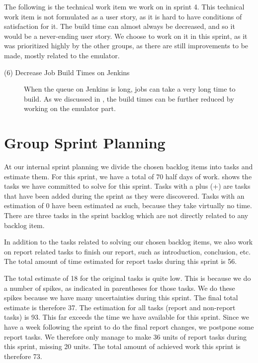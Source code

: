 The following is the technical work item we work on in sprint 4. This technical work item is not formulated as a user story, as it is hard to have conditions of satisfaction for it. The build time can almost always be decreased, and so it would be a never-ending user story. We choose to work on it in this sprint, as it was prioritized highly by the other groups, as there are still improvements to be made, mostly related to the emulator.

\begin{description}
  \item[(6) Decrease Job Build Times on Jenkins] When the queue on Jenkins is long, jobs can take a very long time to build. As we discussed in , the build times can be further reduced by working on the emulator part.
\end{description}

\section{Group Sprint Planning}\label{sec:S4_group}
At our internal sprint planning we divide the chosen backlog items into tasks and estimate them. For this sprint, we have a total of 70 half days of work.  shows the tasks we have committed to solve for this sprint. Tasks with a plus (+) are tasks that have been added during the sprint as they were discovered. Tasks with an estimation of 0 have been estimated as such, because they take virtually  no time. There are three tasks in the sprint backlog which are not directly related to any backlog item.

In addition to the tasks related to solving our chosen backlog items, we also work on report related tasks to finish our report, such as introduction, conclusion, etc. The total amount of time estimated for report tasks during this sprint is 56.

The total estimate of 18 for the original tasks is quite low. This is because we do a number of spikes, as indicated in parentheses for those tasks. We do these spikes because we have many uncertainties during this sprint. The final total estimate is therefore 37. The estimation for all tasks (report and non-report tasks) is 93. This far exceeds the time we have available for this sprint. Since we have a week following the sprint to do the final report changes, we postpone some report tasks. We therefore only manage to make 36 units of report tasks during this sprint, missing 20 units. The total amount of achieved work this sprint is therefore 73.

